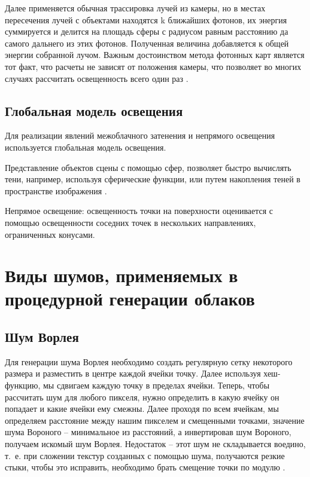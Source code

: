 {Далее применяется обычная трассировка лучей из камеры, но в местах пересечения лучей с объектами находятся k ближайших фотонов, их энергия суммируется и делится на площадь сферы с радиусом равным расстоянию да самого дальнего из этих фотонов. Полученная величина добавляется к общей энергии собранной лучом. Важным  достоинством  метода  фотонных  карт  является  тот  факт,  что  расчеты  не 
зависят  от  положения  камеры,  что  позволяет во  многих  случаях  рассчитать  освещенность 
всего  один  раз \cite{photon}.

\subsection{Глобальная модель освещения}

Для реализации явлений межоблачного затенения и непрямого освещения используется глобальная модель освещения.

Представление объектов сцены с помощью сфер, позволяет быстро вычислять тени, например, используя сферические функции, или путем накопления теней в пространстве изображения \cite{clouds}.

Непрямое освещение: освещенность точки на поверхности оценивается с помощью освещенности соседних точек в нескольких направлениях, ограниченных конусами.
}
\section{Виды шумов, применяемых в процедурной генерации облаков}

\subsection{Шум Ворлея}

Для генерации шума Ворлея необходимо создать регулярную сетку некоторого размера и разместить в центре каждой ячейки точку. Далее используя хеш-функцию, мы сдвигаем каждую точку в пределах ячейки. Теперь, чтобы рассчитать шум для любого пикселя, нужно определить в какую ячейку он попадает и какие ячейки ему смежны. Далее проходя по всем ячейкам, мы определяем расстояние между нашим пикселем и смещенными точками, значение шума Вороного -- минимальное из расстояний, а инвертировав шум Вороного, получаем искомый шум Ворлея. 
Недостаток -- этот шум не складывается воедино, т.~е. при сложении текстур созданных с помощью шума, получаются резкие стыки, чтобы это исправить, необходимо брать смещение точки по модулю \cite{worley}.

